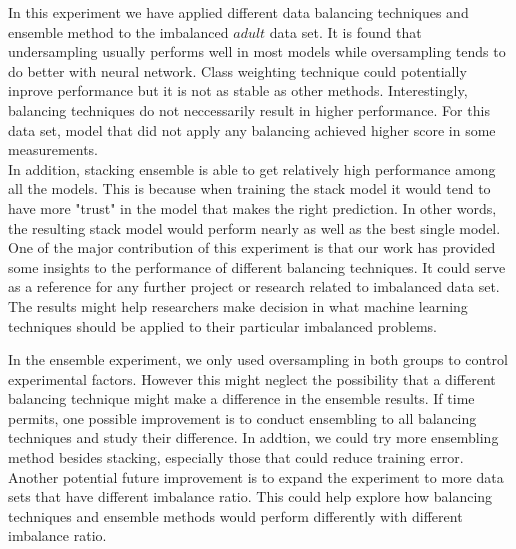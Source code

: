 \documentclass{article}
\begin{document}
In this experiment we have applied different data balancing techniques and ensemble method to the imbalanced $adult$ data set. It is found that undersampling usually performs well in most models while oversampling tends to do better with neural network. Class weighting technique could potentially inprove performance but it is not as stable as other methods. Interestingly, balancing techniques do not neccessarily result in higher performance. For this data set, model that did not apply any balancing achieved higher score in some measurements.\\

In addition, stacking ensemble is able to get relatively high performance among all the models. This is because when training the stack model it would tend to have more "trust" in the model that makes the right prediction. In other words, the resulting stack model would perform nearly as well as the best single model.\\

One of the major contribution of this experiment is that our work has provided some insights to the performance of different balancing techniques. It could serve as a reference for any further project or research related to imbalanced data set. The results might help researchers make decision in what machine learning techniques should be applied to their particular imbalanced problems.

In the ensemble experiment, we only used oversampling in both groups to control experimental factors. However this might neglect the possibility that a different balancing technique might make a difference in the ensemble results. If time permits, one possible improvement is to conduct ensembling to all balancing techniques and study their difference. In addtion, we could try more ensembling method besides stacking, especially those that could reduce training error.\\

Another potential future improvement is to expand the experiment to more data sets that have different imbalance ratio. This could help explore how balancing techniques and ensemble methods would perform differently with different imbalance ratio.
\medskip


\end{document}
